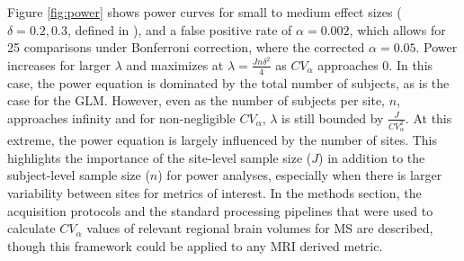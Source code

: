 Figure \ref{fig:power} shows power curves for small to medium effect sizes ($\delta = 0.2, 0.3$, defined in \cite{Raudenbush2000}), and a false positive rate of $\alpha = 0.002$, which allows for 25 comparisons under Bonferroni correction, where the corrected $\alpha = 0.05$. Power increases for larger $\lambda$  and maximizes at $\lambda = \frac{Jn\delta^2}{4}$ as $CV_\alpha$ approaches 0. In this case, the power equation is dominated by the total number of subjects, as is the case for the GLM. However, even as the number of subjects per site, $n$, approaches infinity and for non-negligible $CV_\alpha$, $\lambda$ is still bounded by $\frac{J}{CV_\alpha^2}$. At this extreme, the  power equation is largely influenced by the number of sites. This highlights the importance of the site-level sample size ($J$) in addition to the subject-level sample size ($n$) for power analyses, especially when there is larger variability between sites for metrics of interest. In the methods section, the acquisition protocols and the standard processing pipelines that were used to calculate $CV_\alpha$ values of relevant regional brain volumes for MS are described, though this framework could be applied to any MRI derived metric.
